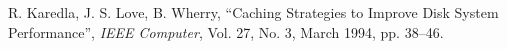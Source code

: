 \begin{thebibliography}{99}



R. Karedla, J. S. Love, B. Wherry,
``Caching Strategies to Improve Disk System Performance'',
{\it IEEE Computer},
Vol. 27, No. 3, March 1994, pp. 38--46.










\end{thebibliography}
